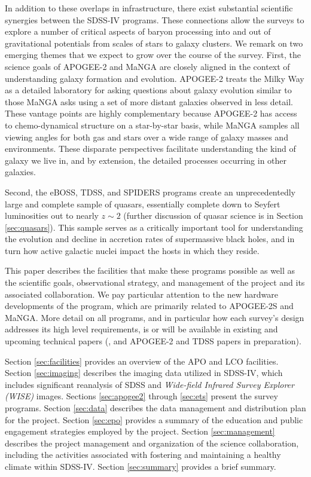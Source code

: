 In addition to these overlaps in infrastructure, there exist
substantial scientific synergies between the SDSS-IV programs. These
connections allow the surveys to explore a number of critical aspects
of baryon processing into and out of gravitational potentials from
scales of stars to galaxy clusters. We remark on two emerging themes
that we expect to grow over the course of the survey. First, the
science goals of APOGEE-2 and MaNGA are closely aligned in the context
of understanding galaxy formation and evolution. APOGEE-2 treats the
Milky Way as a detailed laboratory for asking questions about galaxy
evolution similar to those MaNGA asks using a set of more distant
galaxies observed in less detail. These vantage points are highly
complementary because APOGEE-2 has access to chemo-dynamical structure
on a star-by-star basis, while MaNGA samples all viewing angles for
both gas and stars over a wide range of galaxy masses and
environments. These disparate perspectives facilitate understanding
the kind of galaxy we live in, and by extension, the detailed
processes occurring in other galaxies.

Second, the eBOSS, TDSS, and SPIDERS programs create an
unprecedentedly large and complete sample of quasars, essentially
complete down to Seyfert luminosities out to nearly $z\sim 2$ (further
discussion of quasar science is in Section \ref{sec:quasars}).  This
sample serves as a critically important tool for understanding the
evolution and decline in accretion rates of supermassive black holes,
and in turn how active galactic nuclei impact the hosts in which they
reside.

This paper describes the facilities that make these programs possible
as well as the scientific goals, observational strategy, and
management of the project and its associated collaboration. We pay
particular attention to the new hardware developments of the program,
which are primarily related to APOGEE-2S and MaNGA. More detail on all
programs, and in particular how each survey's design addresses its
high level requirements, is or will be available in existing and
upcoming technical papers (\citealt{bundy15a, morganson15a, clerc16a,
dawson16a, dwelly17a}, and APOGEE-2 and TDSS papers in preparation).

Section 
\ref{sec:facilities} provides an overview of the APO and LCO facilities.
Section \ref{sec:imaging} describes the imaging data utilized in
SDSS-IV, which includes significant reanalysis of SDSS and {\it
Wide-field Infrared Survey Explorer (WISE)} images.
Sections \ref{sec:apogee2} through \ref{sec:ets} present the survey
programs.  Section \ref{sec:data} describes the data management and
distribution plan for the project. Section \ref{sec:epo} provides a
summary of the education and public engagement strategies employed by
the project. Section \ref{sec:management} describes the project
management and organization of the science collaboration, including
the activities associated with fostering and maintaining a healthy
climate within SDSS-IV. Section \ref{sec:summary} provides a brief
summary.
